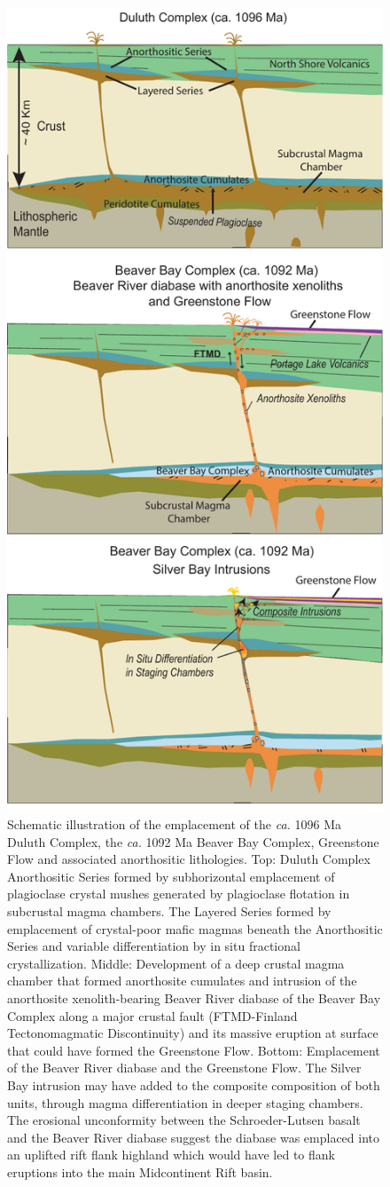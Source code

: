 \documentclass[draft]{agujournal2019}
\begin{document}
\begin{figure}
\centering
\noindent\includegraphics[width=3.5 in]{Flank_eruption.pdf}
\caption{\footnotesize{Schematic illustration of the emplacement of the \textit{ca.} 1096 Ma Duluth Complex, the \textit{ca.} 1092 Ma Beaver Bay Complex, Greenstone Flow and associated anorthositic lithologies. Top: Duluth Complex Anorthositic Series formed by subhorizontal emplacement of plagioclase crystal mushes generated by plagioclase flotation in subcrustal magma chambers. The Layered Series formed by emplacement of crystal-poor mafic magmas beneath the Anorthositic Series and variable differentiation by in situ fractional crystallization. Middle: Development of a deep crustal magma chamber that formed anorthosite cumulates and intrusion of the anorthosite xenolith-bearing Beaver River diabase of the Beaver Bay Complex along a major crustal fault (FTMD-Finland Tectonomagmatic Discontinuity) and its massive eruption at surface that could have formed the Greenstone Flow. Bottom: Emplacement of the Beaver River diabase and the Greenstone Flow. The Silver Bay intrusion may have added to the composite composition of both units, through magma differentiation in deeper staging chambers. The erosional unconformity between the Schroeder-Lutsen basalt and the Beaver River diabase suggest the diabase was emplaced into an uplifted rift flank highland which would have led to flank eruptions into the main Midcontinent Rift basin.}}
\label{fig:Flank_eruption}
\end{figure}
\end{document}
